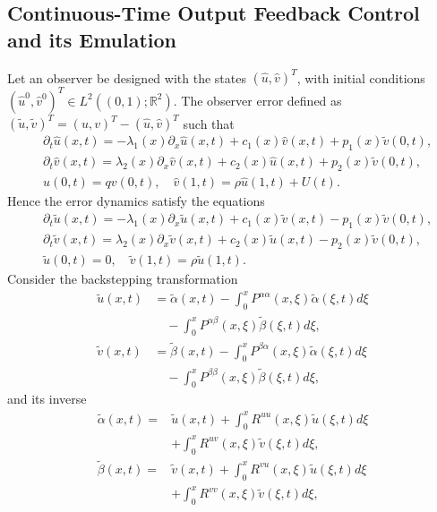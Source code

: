\documentclass[letterpaper, 10 pt, conference]{ieeeconf}
\begin{document}
\subsection{Continuous-Time Output Feedback Control and its Emulation}
Let an observer be designed with the states $(\hat u,\hat v)^T$, with initial conditions$(\hat u^0,  \hat v^0)^T \in  L^2((0, 1);\mathbb{R}^2)$. The observer error defined as  $(\tilde u,\tilde v)^T= (u,v)^T - (\hat u,\hat v)^T$ such that
\begin{align}
    &\partial_t \hat u(x,t) = -\lambda_1(x) \partial_x \hat u(x,t) + c_1(x) \hat v(x,t) + p_1(x)\tilde v(0,t),\label{obs-sysu}\\
    &\partial_t \hat v(x,t) = \lambda_2(x) \partial_x \hat v(x,t) + c_2(x) \hat u(x,t)+ p_2(x)\tilde v(0,t),\label{obs-sysv}\\
    &\hat u(0,t) = q v(0,t),\quad
    \hat v(1,t) = \rho \hat u(1,t) + U(t).\label{obs-sysbc}
\end{align}
Hence the error dynamics satisfy the equations
\begin{align}
    &\partial_t \tilde u(x,t) = -\lambda_1(x) \partial_x \tilde u(x,t) + c_1(x) \tilde v(x,t) - p_1(x)\tilde v(0,t),\label{err-sysu}\\
    &\partial_t \tilde v(x,t) = \lambda_2(x) \partial_x \tilde v(x,t) + c_2(x) \tilde u(x,t) - p_2(x)\tilde v(0,t),\label{err-sysv}\\
    &\tilde u(0,t) = 0,\quad
    \tilde v(1,t) = \rho \tilde u(1,t).\label{err-sysbc}
\end{align}
Consider the backstepping transformation
\begin{align}
    \tilde{u}(x,t) & =\tilde{\alpha}(x,t)-\int_0^x P^{\alpha\alpha}(x, \xi) \tilde{\alpha}(\xi,t) d\xi\nonumber\\&\quad-\int_0^x P^{\alpha\beta}(x, \xi) \tilde{\beta}(\xi,t) d\xi,\label{err-backstepping1}\\
\tilde{v}(x,t) & =\tilde{\beta}(x,t)-\int_0^x P^{\beta\alpha}(x, \xi) \tilde{\alpha}(\xi,t) d\xi\nonumber\\&\quad-\int_0^x P^{\beta\beta}(x, \xi) \tilde{\beta}(\xi,t) d\xi,\label{err-backstepping2}
\end{align}
and its inverse 
\begin{align}
\tilde{\alpha}(x,t)=&\tilde{u}(x,t)+\int_0^xR^{uu}(x,\xi)\tilde{u}(\xi,t)d\xi\nonumber\\&+\int_0^xR^{uv}(x,\xi)\tilde{v}(\xi,t)d\xi,\label{err-backstepping1-inverse}\\
\tilde{\beta}(x,t)=&\tilde{v}(x,t)+\int_0^xR^{vu}(x,\xi)\tilde{u}(\xi,t)d\xi\nonumber\\&+\int_0^xR^{vv}(x,\xi)\tilde{v}(\xi,t)d\xi,\label{err-backstepping2-inverse}
\end{align}
\end{document}
